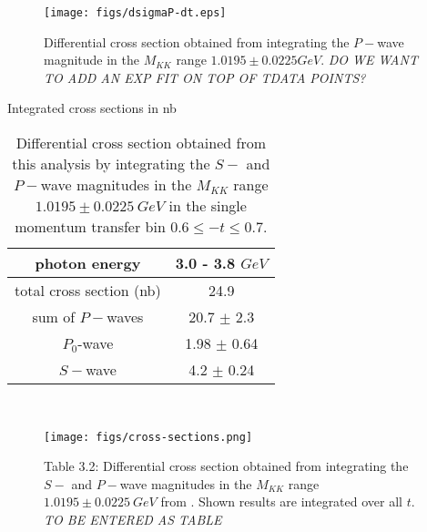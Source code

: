 \documentclass[twocolumn,superscriptaddress,prd]{revtex4}
\begin{document}
\begin{figure}
\texttt{[image: figs/dsigmaP-dt.eps]}
\caption{Differential cross section obtained from integrating the $P-$wave magnitude in the $M_{KK}$ range $1.0195 \pm 0.0225 GeV$. {\it  DO WE WANT TO ADD AN EXP FIT ON TOP OF TDATA POINTS?} }
\label{fig:dsigma2}
\end{figure}


 \begin{table}
 \caption{Integrated cross sections in nb}
\centering
\begin{tabular}{|c|c|}
	\hline
	photon energy & 3.0 - 3.8 $GeV$ \\
	\hline
total cross section (nb) & 24.9 \\
	\hline
sum of $P-$waves & 20.7 $\pm$ 2.3    \\
	\hline
$P_0$-wave   & 1.98 $\pm$ 0.64   \\
	\hline
$S-$wave &    4.2 $\pm$ 0.24 \\
	\hline
\end{tabular}
\\
\caption{Differential cross section obtained from this analysis by integrating the $S-$ and $P-$wave magnitudes in the $M_{KK}$ range $1.0195 \pm 0.0225 \ GeV$ in the single momentum transfer bin $0.6 \le - t \le 0.7$.}
\label{tab:results}
\end{table}

\begin{figure}
\texttt{[image: figs/cross-sections.png]}
\caption{Table 3.2: Differential cross section obtained from integrating the $S-$ and $P-$wave magnitudes in the $M_{KK}$ range $1.0195 \pm 0.0225 \ GeV$ from \cite{Lesniak:2005}. Shown results are integrated over all $t$. {\it TO BE ENTERED AS TABLE}}
\label{fig:lesniak}
\end{figure}
\end{document}
